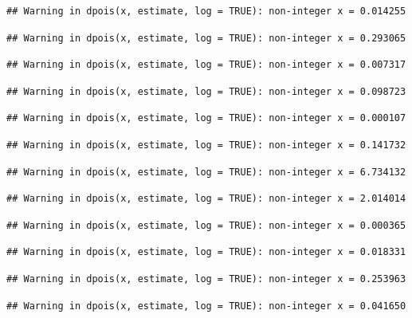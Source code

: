 \documentclass[]{article}
\begin{document}
\begin{verbatim}
## Warning in dpois(x, estimate, log = TRUE): non-integer x = 0.014255
\end{verbatim}

\begin{verbatim}
## Warning in dpois(x, estimate, log = TRUE): non-integer x = 0.293065
\end{verbatim}

\begin{verbatim}
## Warning in dpois(x, estimate, log = TRUE): non-integer x = 0.007317
\end{verbatim}

\begin{verbatim}
## Warning in dpois(x, estimate, log = TRUE): non-integer x = 0.098723
\end{verbatim}

\begin{verbatim}
## Warning in dpois(x, estimate, log = TRUE): non-integer x = 0.000107
\end{verbatim}

\begin{verbatim}
## Warning in dpois(x, estimate, log = TRUE): non-integer x = 0.141732
\end{verbatim}

\begin{verbatim}
## Warning in dpois(x, estimate, log = TRUE): non-integer x = 6.734132
\end{verbatim}

\begin{verbatim}
## Warning in dpois(x, estimate, log = TRUE): non-integer x = 2.014014
\end{verbatim}

\begin{verbatim}
## Warning in dpois(x, estimate, log = TRUE): non-integer x = 0.000365
\end{verbatim}

\begin{verbatim}
## Warning in dpois(x, estimate, log = TRUE): non-integer x = 0.018331
\end{verbatim}

\begin{verbatim}
## Warning in dpois(x, estimate, log = TRUE): non-integer x = 0.253963
\end{verbatim}

\begin{verbatim}
## Warning in dpois(x, estimate, log = TRUE): non-integer x = 0.041650
\end{verbatim}
\end{document}
